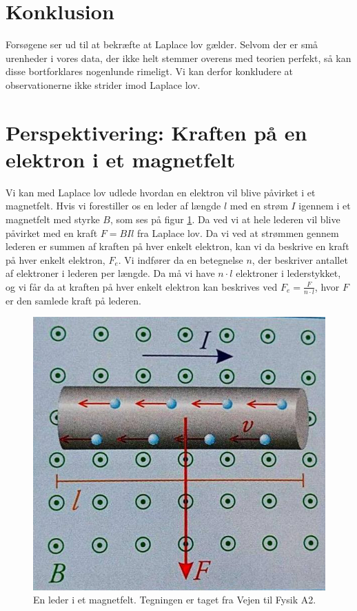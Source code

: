 \documentclass[10pt,a4paper]{article}
\theoremstyle{break}
\theoremstyle{nonumberplain}
\begin{document}
\section{Konklusion}
Forsøgene ser ud til at bekræfte at Laplace lov gælder. 
Selvom der er små urenheder i vores data, der ikke helt stemmer overens med teorien perfekt, så kan disse bortforklares nogenlunde rimeligt. 
Vi kan derfor konkludere at observationerne ikke strider imod Laplace lov.

\pagebreak

\section{Perspektivering: Kraften på en elektron i et magnetfelt}
Vi kan med Laplace lov udlede hvordan en elektron vil blive påvirket i et magnetfelt. 
Hvis vi forestiller os en leder af længde $l$ med en strøm $I$ igennem i et magnetfelt med styrke $B$, som ses på figur \ref{leder}.
Da ved vi at hele lederen vil blive påvirket med en kraft $F=BIl$ fra Laplace lov.
Da vi ved at strømmen gennem lederen er summen af kraften på hver enkelt elektron, kan vi da beskrive en kraft på hver enkelt elektron, $F_e$.
Vi indfører da en betegnelse $n$, der beskriver antallet af elektroner i lederen per længde.
Da må vi have $n\cdot l$ elektroner i lederstykket, og vi får da at kraften på hver enkelt elektron kan beskrives ved $F_e= \frac{F}{n\cdot l}$, hvor $F$ er den samlede kraft på lederen. 

\begin{figure}[h]
\begin{center}

\includegraphics[scale=0.3]{elektron}
\caption{En leder i et magnetfelt. Tegningen er taget fra Vejen til Fysik A2.}
\label{leder}

\end{center}
\end{figure}
\end{document}
